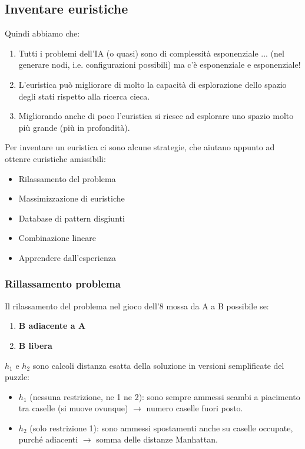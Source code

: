 \subsection{Inventare euristiche}
Quindi abbiamo che:
\begin{enumerate}
    \item Tutti i problemi dell’IA (o quasi) sono di complessità esponenziale ... (nel generare nodi, i.e. configurazioni possibili) ma c’è esponenziale e esponenziale!
    \item L’euristica può migliorare di molto la capacità di esplorazione dello spazio degli stati rispetto alla ricerca cieca.
    \item Migliorando anche di poco l’euristica si riesce ad esplorare uno spazio molto più grande (più in profondità).
\end{enumerate}
Per inventare un euristica ci sono alcune strategie, che aiutano appunto ad ottenre euristiche amissibili:
\begin{itemize}
    \item Rilassamento del problema
    \item Massimizzazione di euristiche
    \item Database di pattern disgiunti
    \item Combinazione lineare
    \item Apprendere dall’esperienza
\end{itemize} 
\subsubsection{Rillassamento problema}
\begin{example}
    Il rilassamento del problema nel gioco dell’8 mossa da A a B possibile se: 
    \begin{enumerate}
        \item \textbf{B adiacente a A}
        \item \textbf{B libera}
    \end{enumerate}
    $h_1$ e $h_2$ sono calcoli distanza esatta della soluzione in versioni semplificate del puzzle:
    \begin{itemize}
        \item $h_1$ (nessuna restrizione, ne 1 ne 2): sono sempre ammessi scambi a piacimento tra caselle (si muove
        ovunque) $\to$ numero caselle fuori posto.
        \item  $h_2$ (solo restrizione 1): sono ammessi spostamenti anche su caselle occupate, purché adiacenti $\to$ somma delle distanze Manhattan.
    \end{itemize}
\end{example}

